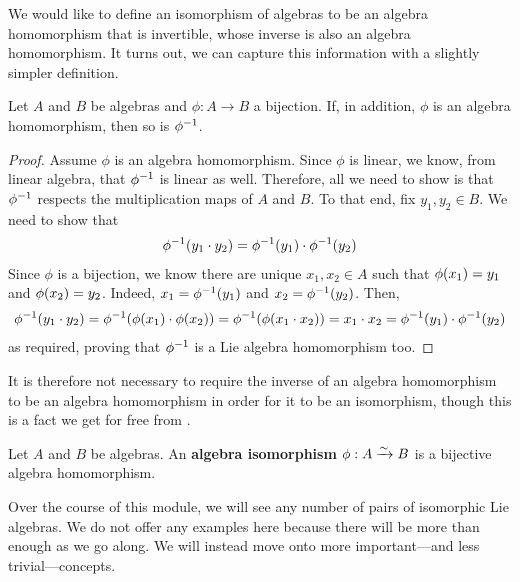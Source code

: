 We would like to define an isomorphism of algebras to be an algebra homomorphism that is invertible, whose inverse is also an algebra homomorphism. It turns out, we can capture this information with a slightly simpler definition.

\begin{boxlemma}\label{Ch1:Lemma:Inv_of_Bij_Hom_Alg_Hom}
    Let $A$ and $B$ be algebras and $\phi : A \to B$ a bijection. If, in addition, $\phi$ is an algebra homomorphism, then so is $\phi^{-1}$.
\end{boxlemma}
\begin{proof}
    Assume $\phi$ is an algebra homomorphism. Since $\phi$ is linear, we know, from linear algebra, that $\phi^{-1}$ is linear as well. Therefore, all we need to show is that $\phi^{-1}$ respects the multiplication maps of $A$ and $B$. To that end, fix $y_1, y_2 \in B$. We need to show that
    \begin{align*}
        \phi^{-1}\!\left( y_1 \cdot y_2 \right) = \phi^{-1}\!\left( y_1 \right) \cdot \phi^{-1}\!\left( y_2 \right)
    \end{align*}
    Since $\phi$ is a bijection, we know there are unique $x_1, x_2 \in A$ such that $\phi\!\left( x_1 \right) = y_1$ and $\phi\!\left( x_2 \right) = y_2$. Indeed, $x_1 = \phi^{-1}\!\left( y_1 \right)$ and $x_2 = \phi^{-1}\!\left( y_2 \right)$. Then,
    \begin{align*}
        \phi\inv\of{y_1 \cdot y_2} = \phi\inv\of{\phiof{x_1} \cdot \phiof{x_2}} = \phi\inv\of{\phiof{x_1 \cdot x_2}} = x_1 \cdot x_2 = \phi\inv\of{y_1} \cdot \phi\inv\of{y_2}
    \end{align*}
    as required, proving that $\phi^{-1}$ is a Lie algebra homomorphism too.
\end{proof}

It is therefore not necessary to require the inverse of an algebra homomorphism to be an algebra homomorphism in order for it to be an isomorphism, though this is a fact we get for free from .

\begin{boxdefinition}
    Let $A$ and $B$ be algebras. An \textbf{algebra isomorphism} $\phi : A \xrightarrow{\sim} B$ is a bijective algebra homomorphism.
\end{boxdefinition}

Over the course of this module, we will see any number of pairs of isomorphic Lie algebras. We do not offer any examples here because there will be more than enough as we go along. We will instead move onto more important---and less trivial---concepts.

